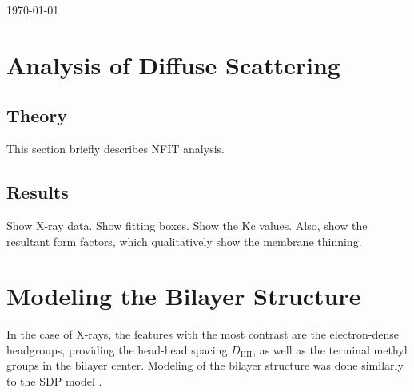 \documentclass[12pt,letterpaper]{article}
\newcommand{\DHH}{D_\textrm{HH}}
\begin{document}
\today

\section{Analysis of Diffuse Scattering}
\subsection{Theory}
This section briefly describes NFIT analysis. 

\subsection{Results}
Show X-ray data. Show fitting boxes.
Show the Kc values.
Also, show the resultant
form factors, which qualitatively show the membrane thinning.

\newpage
\section{Modeling the Bilayer Structure}
In the case of X-rays, the features with the most contrast are the 
electron-dense headgroups, providing the head-head spacing $\DHH$,
as well as the terminal methyl groups in the bilayer center.
Modeling of the bilayer structure was done similarly to the SDP model 
\cite{ref:Kucerka08}. 
\end{document}
